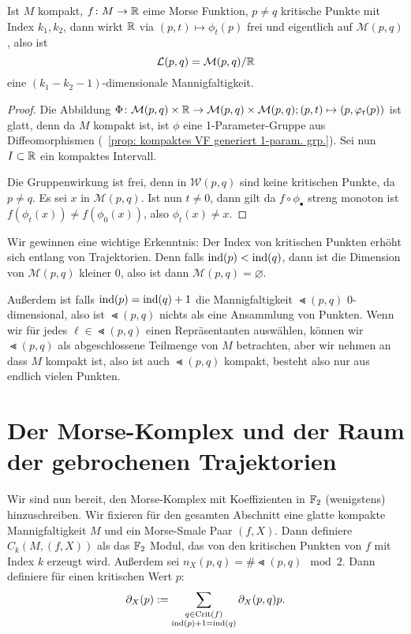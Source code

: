 \begin{prop}
    Ist $M$ kompakt, $f \colon M \to { \mathbb R }$ eime Morse Funktion, $p \neq q$ kritische Punkte mit Index
    $k_1, k_2$, dann wirkt ${ \mathbb R }$ via $(p, t) \mapsto \phi_t(p)$ frei und eigentlich auf 
    $\mathcal{M} (p, q)$, also ist
    \[ { \mathcal{L} } (p, q) = \mathcal{M}(p, q)/{ \mathbb R } \]
    eine $(k_1 - k_2 - 1)$-dimensionale Mannigfaltigkeit.
\end{prop}

\begin{proof}
    Die Abbildung 
    $\Phi \colon \mathcal{M} (p , q) \times { \mathbb R } \to \mathcal{M} (p, q) \times \mathcal{M} (p,q) ; 
    (p, t) \mapsto (p, \varphi_t(p))$ ist glatt, denn da $M$ kompakt ist, ist $\phi$ eine 
    1-Parameter-Gruppe aus Diffeomorphismen (~\ref{prop: kompaktes VF generiert 1-param. grp.}). 
    Sei nun $I \subset { \mathbb R }$ ein kompaktes Intervall. 

    Die Gruppenwirkung ist frei, denn in $\mathcal{W} (p, q)$
    sind keine kritischen Punkte, da $p \neq q$. Es sei $x$ in $\mathcal{M} (p, q)$. 
    Ist nun $t \neq 0$, dann gilt da $f \circ \phi_{\bullet}$ streng monoton ist 
    $f(\phi_t(x)) \neq f(\phi_0(x))$, also $\phi_t(x) \neq x$.
\end{proof}

Wir gewinnen eine wichtige Erkenntnis: Der Index von kritischen Punkten erhöht sich entlang von
Trajektorien. Denn falls ${ \operatorname{ind} } (p) < { \operatorname{ind} } (q)$, dann ist die Dimension von $\mathcal{M} (p, q)$
kleiner $0$, also ist dann $\mathcal{M} (p, q) = \varnothing$.

Außerdem ist falls ${ \operatorname{ind} } (p) = { \operatorname{ind} } (q) + 1$ die Mannigfaltigkeit $\Lt(p, q)$ $0$-dimensional,
also ist $\Lt (p, q)$ nichts als eine Ansammlung von Punkten. Wenn wir für jedes 
$\ell \in \Lt (p, q)$ einen Repräsentanten auswählen, können wir $\Lt (p, q)$ als abgeschlossene Teilmenge 
von $M$ betrachten, aber wir nehmen an dass $M$ kompakt ist, also ist auch $\Lt (p, q)$ kompakt, 
besteht also nur aus endlich vielen Punkten.

\section{Der Morse-Komplex und der Raum der gebrochenen Trajektorien}

Wir sind nun bereit, den Morse-Komplex mit Koeffizienten in ${ \mathbb F }_2$ (wenigstens) hinzuschreiben.
Wir fixieren für den gesamten Abschnitt eine glatte kompakte Mannigfaltigkeit $M$ und ein
Morse-Smale Paar $(f, X)$. Dann definiere
$C_k (M, (f, X))$ als das ${ \mathbb F }_2$ Modul, das von den kritischen Punkten von $f$ mit Index $k$ 
erzeugt wird. Außerdem sei $n_X(p, q) = \# \Lt (p, q) \mod 2$. Dann definiere für einen kritischen Wert
$p$:
\[ { \partial }_X (p) := \sum_{\substack{ q \in { \operatorname{Crit} }(f) \\ { \operatorname{ind} } (p) + 1 = { \operatorname{ind} } (q) }} { \partial }_X(p, q)p . \]

